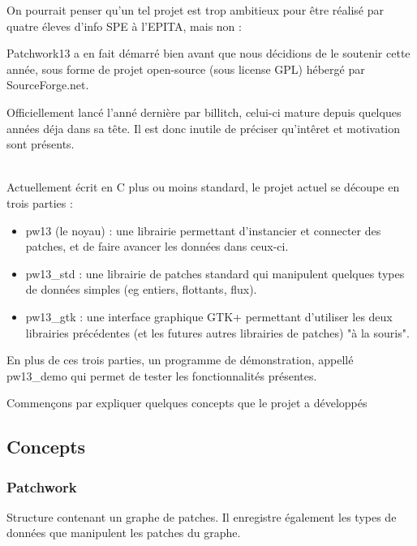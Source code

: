 \documentclass[14pt,a4paper]{article}
\begin{document}
\par
On pourrait penser qu'un tel projet est trop ambitieux pour \^etre
 r\'ealis\'e par quatre \'eleves d'info SPE \`a l'EPITA, mais non :
\\
\par
Patchwork13 a en fait d\'emarr\'e bien avant que nous d\'ecidions
 de le soutenir cette ann\'ee, sous forme de projet open-source
 (sous license GPL) h\'eberg\'e par SourceForge.net.
\\
\par
Officiellement lanc\'e l'ann\'e derni\`ere par billitch, celui-ci mature
 depuis quelques ann\'ees d\'eja dans sa t\^ete. Il est donc inutile de
 pr\'eciser qu'int\^eret et motivation sont pr\'esents.
\\
\\
\par
Actuellement \'ecrit en C plus ou moins standard, le projet actuel
 se d\'ecoupe en trois parties :
\begin{itemize}
\item pw13 (le noyau) : une librairie permettant d'instancier et connecter
 des patches, et de faire avancer les donn\'ees dans ceux-ci.
\item pw13\_std : une librairie de patches standard qui manipulent
 quelques types de donn\'ees simples (eg entiers, flottants, flux).
\item pw13\_gtk : une interface graphique GTK+ permettant d'utiliser
 les deux librairies pr\'ec\'edentes (et les futures autres librairies
 de patches) "\`a la souris".
\end{itemize}

\par
En plus de ces trois parties, un programme de d\'emonstration,
 appell\'e pw13\_demo qui permet de tester les fonctionnalit\'es
 pr\'esentes.\\
\par
Commen\c{c}ons par expliquer quelques concepts que le projet a d\'evelopp\'es


\subsection{Concepts}

\subsubsection{Patchwork}
Structure contenant un graphe de patches.
Il enregistre \'egalement les types de donn\'ees que manipulent les patches du graphe.
\end{document}
